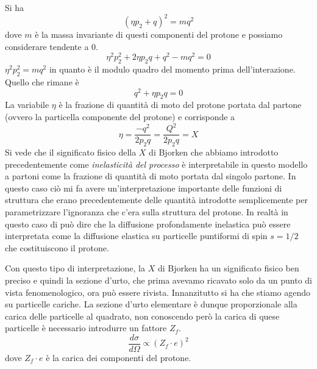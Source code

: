 Si ha
\begin{equation}
(\eta p_2+q)^2=mq^2
\end{equation}
dove $m$ è la massa invariante di questi componenti del protone e possiamo considerare tendente a $0$.
\begin{equation}
\eta^2p_2^2+2\eta p_2q+q^2-mq^2=0
\end{equation}
$\eta^2 p_2^2=mq^2$ in quanto è il modulo quadro del momento prima dell'interazione.
Quello che rimane è 
\begin{equation}
q^2+\eta p_2q=0
\end{equation}
La variabile $\eta$ è la frazione di quantità di moto del protone portata dal partone (ovvero la particella componente del protone) e corrisponde a
\begin{equation}
\eta=\frac{-q^2}{2p_2q}=\frac{Q^2}{2p_2q}=X
\end{equation}
Si vede che il significato fisico della $X$ di Bjorken che abbiamo introdotto precedentemente come \emph{inelasticità del processo} è interpretabile in questo modello a partoni come la frazione di quantità di moto portata dal singolo partone.
In questo caso ciò mi fa avere un'interpretazione importante delle funzioni di struttura che erano precedentemente delle quantità introdotte semplicemente per parametrizzare l'ignoranza che c'era sulla struttura del protone.
In realtà in questo caso di può dire che la diffusione profondamente inelastica può essere interpretata come la diffusione elastica su particelle puntiformi di spin $s=1/2$ che costituiscono il protone.

Con questo tipo di interpretazione, la $X$ di Bjorken ha un significato fisico ben preciso e quindi la sezione d'urto, che prima avevamo ricavato solo da un punto di vista fenomenologico, ora può essere rivista.
Innanzitutto si ha che stiamo agendo su particelle cariche.
La sezione d'urto elementare è dunque proporzionale alla carica delle particelle al quadrato, non conoscendo però la carica di quese particelle è necessario introdurre un fattore $Z_f$.
\begin{equation}
\frac{d\sigma}{d\Omega}\propto (Z_f\cdot e)^2
\end{equation}
dove $Z_f\cdot e$ è la carica dei componenti del protone.

